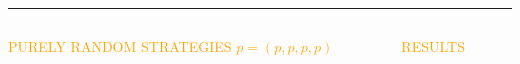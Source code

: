 \documentclass[usenames,dvipsnames,t]{beamer}
\begin{document}
\hrule height 5pt
\begin{columns}
    \begin{column}{.8\linewidth}
        \begin{center}
            \textcolor{orange}{\Large{PURELY RANDOM STRATEGIES \(p=(p, p, p, p)\)}}
        \end{center}
    \end{column}
    \begin{column}{.2\linewidth}
        \begin{center}
            \textcolor{orange}{\Large{RESULTS}}
        \end{center}
    \end{column}
\end{columns}
\end{document}
